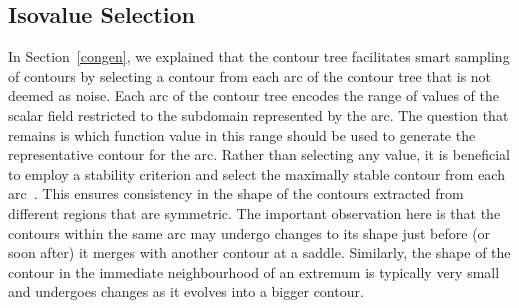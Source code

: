 \documentclass[review,journal]{vgtc}         %
\begin{document}
\subsection{Isovalue Selection}
In Section~\ref{congen}, we explained that the contour tree facilitates smart
sampling of contours by selecting a contour from each arc of the contour tree
that is not deemed as noise. Each arc of the contour tree encodes the range
of values of the scalar field restricted to the subdomain represented by the arc.
The question that remains is which function value in this range should be used
to generate the representative contour for the arc. Rather than selecting any 
value, it is beneficial to employ a stability criterion and select the
maximally stable contour from each arc~\cite{MatasCUP04}. This ensures consistency
in the shape of the contours extracted from different regions that are symmetric.
The important observation here is that the contours within the same arc
may undergo changes to its shape just before (or soon after) it merges 
with another contour at a saddle. Similarly, the shape of the contour in the
immediate neighbourhood of an extremum is typically very small and undergoes
changes as it evolves into a bigger contour. 
\end{document}
